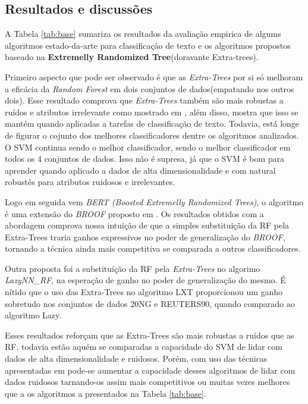 \documentclass[]{article}
\begin{document}
\subsection{Resultados e discussões}\label{resultados-e-discussoes}

A Tabela \ref{tab:base} sumariza os resultados da avaliação empirica de
algums algoritmos estado-da-arte para classificação de texto e os
algoritmos propostos baseado na \textbf{Extremelly Randomized
Tree}(doravante Extra-trees).

Primeiro aspecto que pode ser observado é que as \emph{Extra-Trees} por
si só melhoram a eficácia da \emph{Random Forest} em dois conjuntos de
dados(empatando nos outros dois). Esse resultado comprova que
\emph{Extra-Trees} também são mais robustas a ruídos e atributos
irrelevante como mostrado em \citep{GEURTS2006}, além disso, mostra que
isso se mantém quando aplicadas a tarefas de classificação de texto.
Todavia, está longe de figurar o cojunto dos melhores classificadores
dentre os algoritmos analizados. O SVM continua sendo o melhor
classificador, sendo o melhor classificador em todos os 4 conjuntos de
dados. Isso não é supresa, já que o SVM é bom para aprender quando
aplicado a dados de alta dimensionalidade e com natural robustês para
atributos ruidosos e irrelevantes.

Logo em seguida vem \emph{BERT (Boosted Extremelly Randomized Trees)}, o
algoritmo é uma extensão do \emph{BROOF} proposto em
\citep{Salles:2015:BEO:2766462.2767747}. Os resultados obtidos com a
abordagem comprova nossa intuição de que a simples substituição da RF
pela Extra-Trees traria ganhos expressivos no poder de generalização do
\emph{BROOF}, tornando a técnica ainda mais competitiva se comparada a
outros classificadores.

Outra proposta foi a substituíção da RF pela \emph{Extra-Trees} no
algorimo \emph{LazyNN\_RF}, na esperação de ganho no poder de
generalização do mesmo. É nítido que o uso das Extra-Trees no algoritmo
LXT proporcionou um ganho sobretudo nos conjuntos de dados 20NG e
REUTERS90, quando comparado ao algoritmo Lazy.

Esses resultados reforçam que as Extra-Trees são mais robustas a ruídos
que as RF, todavia estão aquém se comparadas a capacidade do SVM de
lidar com dados de alta dimensionalidade e ruidosos. Porém, com uso das
técnicas apresentadas em \citep{Salles:Proposal:2015} pode-se aumentar a
capacidade desses algoritmos de lidar com dados ruidosos tarnando-os
assim mais competitivos ou muitas vezes melhores que a os algoritmos a
presentados na Tabela \ref{tab:base}.
\end{document}
